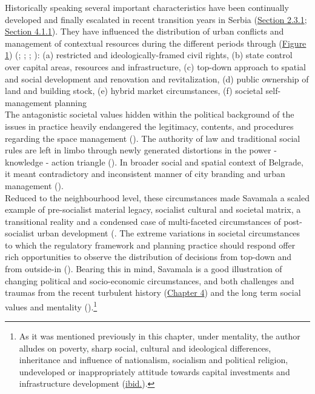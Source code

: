 \documentclass[11pt]{report}
\begin{document}
Historically speaking several important characteristics have been continually developed and finally escalated in recent transition years in Serbia (\href{Section 2.3.1}{Section 2.3.1}; \href{Section 4.1.1}{Section 4.1.1}). They have influenced the distribution of urban conflicts and management of contextual resources during the different periods through (\href{Figure 1}{Figure 1}) (\href{ref}{\citealt{simmie_self-management_1989}}; \href{ref}{\citealt{vujovic_belgrades_2007}}; \href{ref}{\citealt{petrovic_cities_2009}}; \href{ref}{\citealt{vujosevic_postsocijalisticka_2010}}): 
(a) restricted and ideologically-framed civil rights, 
(b) state control over capital areas, resources and infrastructure,
(c) top-down approach to spatial and social development and renovation and revitalization,
(d) public ownership of land and building stock,
(e) hybrid market circumstances,
(f) societal self-management planning
\\

The antagonistic societal values hidden within the political background of the issues in practice heavily endangered the legitimacy, contents, and procedures regarding the space management (\href{ref}{\citealt{vujosevic_planning_2006}}).
The authority of law and traditional social rules are left in limbo through newly generated distortions in the power - knowledge - action triangle (\href{ref}{\citealt{friedmann_planning_1987}}).
In broader social and spatial context of Belgrade, it meant contradictory and inconsistent manner of city branding and urban management
(\href{ref}{\citealt{doytchinov_belgrade:_2015}}).
\\

Reduced to the neighbourhood level, these circumstances made Savamala a scaled example of pre-socialist material legacy, socialist cultural and societal matrix, a transitional reality and a condensed case of multi-faceted circumstances of post-socialist urban development (\href{ref}{\citealt{CvetinovicEtAl2016b}}.
The extreme variations in societal circumstances to which the regulatory framework and planning practice should respond offer rich opportunities to observe the distribution of decisions from top-down and from outside-in (\href{Peric}{\citealt{peric_evolution_2016}}).
Bearing this in mind, Savamala is a good illustration of changing political and socio-economic circumstances, and both challenges and  traumas from the recent turbulent history (\href{Chapter 4}{Chapter 4}) and the long term social values and mentality (\href{ref}{\citealt{doytchinov_belgrade_2015}}).\footnote{As it was mentioned previously in this chapter, under mentality, the author alludes on poverty, sharp social, cultural and ideological differences, inheritance and influence of nationalism, socialism and political religion, undeveloped or inappropriately attitude towards capital investments and infrastructure development (\href{Samardzic}{ibid.}).}
\\
\end{document}
